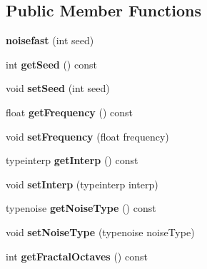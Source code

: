 \subsection*{Public Member Functions}
\begin{DoxyCompactItemize}
\item 
\mbox{\label{classnoisefast_ae2317d107c19a2919527f4e68510a5d8}} 
{\bfseries noisefast} (int seed)
\item 
\mbox{\label{classnoisefast_a121695c5f6dbc1da8069e49c103807c2}} 
int {\bfseries get\+Seed} () const
\item 
\mbox{\label{classnoisefast_a730039e347de64607bf1a25c7b29590c}} 
void {\bfseries set\+Seed} (int seed)
\item 
\mbox{\label{classnoisefast_af2031252affd7cfbbe6762b021d9d0b8}} 
float {\bfseries get\+Frequency} () const
\item 
\mbox{\label{classnoisefast_a5858ab5fe495575080dc17fd81b8bc22}} 
void {\bfseries set\+Frequency} (float frequency)
\item 
\mbox{\label{classnoisefast_a2f8cc7184e36b979d41189535592a273}} 
typeinterp {\bfseries get\+Interp} () const
\item 
\mbox{\label{classnoisefast_ad80a06f33e63763981686d98373fb9db}} 
void {\bfseries set\+Interp} (typeinterp interp)
\item 
\mbox{\label{classnoisefast_a90de006bb0b47a28b80069b0b174389f}} 
typenoise {\bfseries get\+Noise\+Type} () const
\item 
\mbox{\label{classnoisefast_a9c8b2f29f45423c7cc28e1d2e6a5748c}} 
void {\bfseries set\+Noise\+Type} (typenoise noise\+Type)
\item 
\mbox{\label{classnoisefast_a38da6c927beb5091a2590e0d4586b613}} 
int {\bfseries get\+Fractal\+Octaves} () const
\item 
\mbox{\label{classnoisefast_ad302a97e0616117354cd6cc6f394e39a}} 

\end{DoxyCompactItemize}
